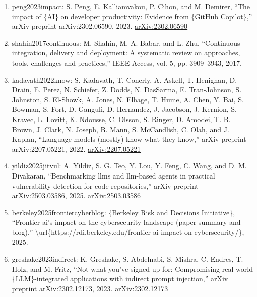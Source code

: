 \documentclass[11pt]{article}
\begin{document}
\begin{enumerate}[leftmargin=*]
  \item peng2023impact: S. Peng, E. Kalliamvakou, P. Cihon, and M. Demirer, ``The impact of \{AI\} on developer productivity: Evidence from \{GitHub Copilot\},'' arXiv preprint arXiv:2302.06590, 2023. \href{https://arxiv.org/abs/2302.06590}{arXiv:2302.06590}
  \item shahin2017continuous: M. Shahin, M. A. Babar, and L. Zhu, ``Continuous integration, delivery and deployment: A systematic review on approaches, tools, challenges and practices,'' IEEE Access, vol. 5, pp. 3909--3943, 2017.
  \item kadavath2022know: S. Kadavath, T. Conerly, A. Askell, T. Henighan, D. Drain, E. Perez, N. Schiefer, Z. Dodds, N. DasSarma, E. Tran-Johnson, S. Johnston, S. El-Showk, A. Jones, N. Elhage, T. Hume, A. Chen, Y. Bai, S. Bowman, S. Fort, D. Ganguli, D. Hernandez, J. Jacobson, J. Kernion, S. Kravec, L. Lovitt, K. Ndousse, C. Olsson, S. Ringer, D. Amodei, T. B. Brown, J. Clark, N. Joseph, B. Mann, S. McCandlish, C. Olah, and J. Kaplan, ``Language models (mostly) know what they know,'' arXiv preprint arXiv:2207.05221, 2022. \href{https://arxiv.org/abs/2207.05221}{arXiv:2207.05221}
  \item yildiz2025jitvul: A. Yildiz, S. G. Teo, Y. Lou, Y. Feng, C. Wang, and D. M. Divakaran, ``Benchmarking llms and llm-based agents in practical vulnerability detection for code repositories,'' arXiv preprint arXiv:2503.03586, 2025. \href{https://arxiv.org/abs/2503.03586}{arXiv:2503.03586}
  \item berkeley2025frontiercyberblog: \{Berkeley Risk and Decisions Initiative\}, ``Frontier ai's impact on the cybersecurity landscape (paper summary and blog),'' \textbackslash{}url\{https://rdi.berkeley.edu/frontier-ai-impact-on-cybersecurity/\}, 2025.
  \item greshake2023indirect: K. Greshake, S. Abdelnabi, S. Mishra, C. Endres, T. Holz, and M. Fritz, ``Not what you've signed up for: Compromising real-world \{LLM\}-integrated applications with indirect prompt injection,'' arXiv preprint arXiv:2302.12173, 2023. \href{https://arxiv.org/abs/2302.12173}{arXiv:2302.12173}
\end{enumerate}

% 
% 
\end{document}
